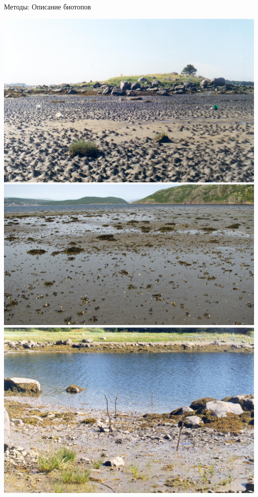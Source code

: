 \documentclass{beamer}
\begin{document}
\begin{frame}{Методы: Описание биотопов}
	\begin{minipage}[c]{.3\linewidth}
		\begin{center}
			\includegraphics[width=\textwidth]{Luvenga_Estuary.JPG}\\
			\includegraphics[width=\textwidth]{Ura.JPG} \\
			\includegraphics[width=\textwidth]{Goreliy.JPG} \\

\end{center}
\end{minipage}
\end{frame}
\end{document}
